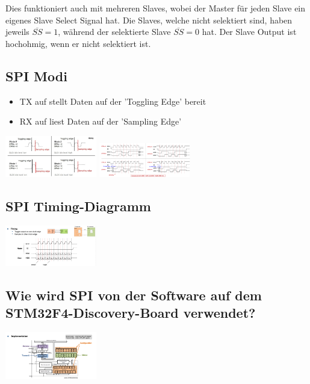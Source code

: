 Dies funktioniert auch mit mehreren Slaves, wobei der Master für jeden Slave ein eigenes Slave Select Signal hat. Die Slaves, welche nicht selektiert sind, haben jeweils $\overline{SS}=1$, während der selektierte Slave $\overline{SS}=0$ hat. Der Slave Output ist hochohmig, wenn er nicht selektiert ist.

\subsection{SPI Modi}
\begin{itemize}
    \item TX auf stellt Daten auf der 'Toggling Edge' bereit
    \item RX auf liest Daten auf der 'Sampling Edge'
\end{itemize}

\includegraphics[width=0.3\textwidth]{sections/images/spi_mode1.png}
\includegraphics[width=0.3\textwidth]{sections/images/spi_mode2.png}

\subsection{SPI Timing-Diagramm}
\includegraphics[width=0.3\textwidth]{sections/images/spi_timing.png}

\subsection{Wie wird SPI von der Software auf dem STM32F4-Discovery-Board verwendet?}
\includegraphics[width=0.3\textwidth]{sections/images/spi_impl.png}
